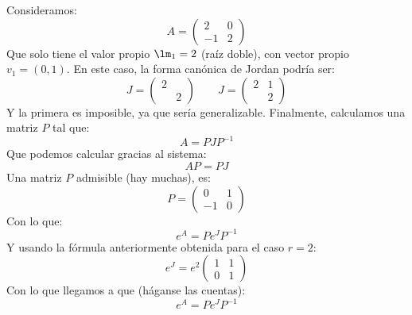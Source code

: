 \begin{enumerate}
        \begin{ejemplo}
            Consideramos:
            \begin{equation*}
                A = \left(\begin{array}{cc}
                        2 & 0 \\
                        -1 & 2
                \end{array}\right)
            \end{equation*}
            Que solo tiene el valor propio $\lm_1=2$ (raíz doble), con vector propio $v_1=(0,1)$. En este caso, la forma canónica de Jordan podría ser:
            \begin{equation*}
                J = \left(\begin{array}{cc}
                        2 & \\
                           & 2
                \end{array}\right)  \qquad 
                J = \left(\begin{array}{cc}
                        2 & 1\\
                           & 2
                \end{array}\right) 
            \end{equation*}
            Y la primera es imposible, ya que sería generalizable. Finalmente, calculamos una matriz $P$ tal que:
            \begin{equation*}
                A = P J P^{-1}
            \end{equation*}
            Que podemos calcular gracias al sistema:
            \begin{equation*}
                AP = PJ
            \end{equation*}
            Una matriz $P$ admisible (hay muchas), es:
            \begin{equation*}
                P = \left(\begin{array}{cc}
                        0 & 1 \\
                        -1 & 0
                \end{array}\right)
            \end{equation*}
            Con lo que:
            \begin{equation*}
                e^A = Pe^J P^{-1}
            \end{equation*}
            Y usando la fórmula anteriormente obtenida para el caso $r=2$:
            \begin{equation*}
                e^J = e^2 \left(\begin{array}{cc}
                        1 & 1 \\
                        0 & 1
                \end{array}\right)
            \end{equation*}
            Con lo que llegamos a que (háganse las cuentas):
            \begin{equation*}
                e^A = P e^J P^{-1}
            \end{equation*}
        \end{ejemplo}
\end{enumerate}

